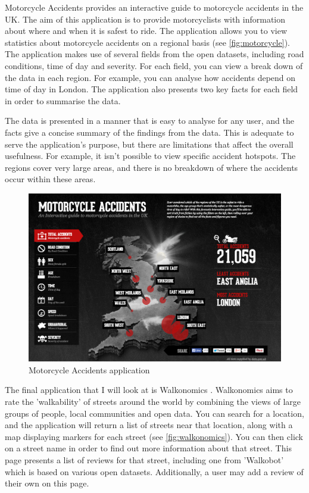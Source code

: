 \documentclass[authoryearcitations]{UoYCSproject}
\begin{document}
Motorcycle Accidents \citep{Mceinsurance} provides an interactive guide to motorcycle accidents in the UK. The aim of this application is to provide motorcyclists with information about where and when it is safest to ride. The application allows you to view statistics about motorcycle accidents on a regional basis (see \autoref{fig:motorcycle}). The application makes use of several fields from the open datasets, including road conditions, time of day and severity. For each field, you can view a break down of the data in each region. For example, you can analyse how accidents depend on time of day in London. The application also presents two key facts for each field in order to summarise the data.

The data is presented in a manner that is easy to analyse for any user, and the facts give a concise summary of the findings from the data. This is adequate to serve the application's purpose, but there are limitations that affect the overall usefulness. For example, it isn't possible to view specific accident hotspots. The regions cover very large areas, and there is no breakdown of where the accidents occur within these areas.

\begin{figure}
	\includegraphics[scale=0.3]{motorcycle}
	\caption{Motorcycle Accidents application}
	\label{fig:motorcycle}
\end{figure}

The final application that I will look at is Walkonomics \citep{Davies}. Walkonomics aims to rate the 'walkability' of streets around the world by combining the views of large groups of people, local communities and open data. You can search for a location, and the application will return a list of streets near that location, along with a map displaying markers for each street (see \autoref{fig:walkonomics}). You can then click on a street name in order to find out more information about that street. This page presents a list of reviews for that street, including one from 'Walkobot' which is based on various open datasets. Additionally, a user may add a review of their own on this page. 
\end{document}

